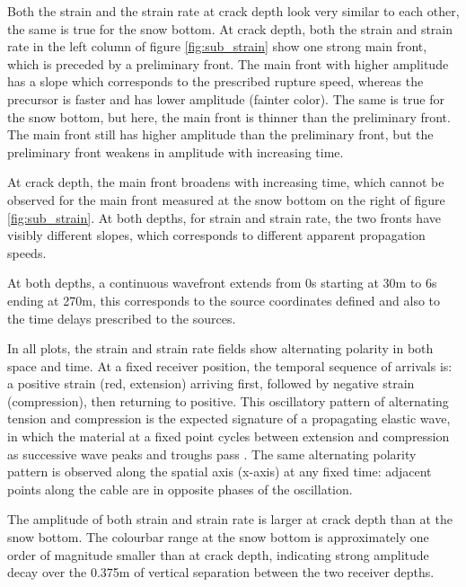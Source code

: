 Both the strain and the strain rate at crack depth look very similar to each other, the same is true for the snow bottom. At crack depth, both the strain and strain rate in the left column of figure \ref{fig:sub_strain} show one strong main front, which is preceded by a preliminary front. The main front with higher amplitude has a slope which corresponds to the prescribed rupture speed, whereas the precursor is faster and has lower amplitude (fainter color). The same is true for the snow bottom, but here, the main front is thinner than the preliminary front. The main front still has higher amplitude than the preliminary front, but the preliminary front weakens in amplitude with increasing time. \par

At crack depth, the main front broadens with increasing time, which cannot be observed for the main front measured at the snow bottom on the right of figure \ref{fig:sub_strain}. At both depths, for strain and strain rate, the two fronts have visibly different slopes, which corresponds to different apparent propagation speeds. \par

At both depths, a continuous wavefront extends from 0s starting at 30m to 6s ending at 270m, this corresponds to the source coordinates defined and also to the time delays prescribed to the sources. \par

In all plots, the strain and strain rate fields show alternating polarity in both space and time. At a fixed receiver position, the temporal sequence of arrivals is:  a positive strain (red, extension) arriving first, followed by negative strain (compression), then returning to positive. This oscillatory pattern of alternating tension and compression is the expected signature of a propagating elastic wave, in which the material at a fixed point cycles between extension and compression as successive wave peaks and troughs pass \parencite{kAkiRichards19801981}. The same alternating polarity pattern is observed along the spatial axis (x-axis) at any fixed time: adjacent points along the cable are in opposite phases of the oscillation. \par

The amplitude of both strain and strain rate is larger at crack depth than at the snow bottom. The colourbar range at the snow bottom is approximately one order of magnitude smaller than at crack depth, indicating strong amplitude decay over the 0.375m of vertical separation between the two receiver depths.\par

